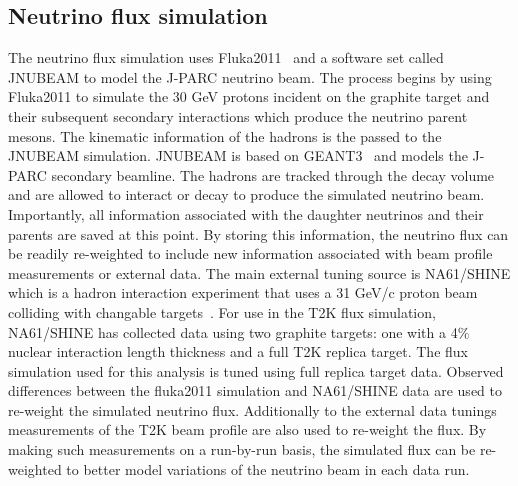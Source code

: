 \subsection{Neutrino flux simulation}
\label{subsec:NeutrinoFluxSimulation}
The neutrino flux simulation uses Fluka2011~\cite{Ferrari_fluka:a} and a software set called JNUBEAM to model the J-PARC neutrino beam.  The process begins by using Fluka2011 to simulate the 30 GeV protons incident on the graphite target and their subsequent secondary interactions which produce the neutrino parent mesons.  The kinematic information of the hadrons is the passed to the JNUBEAM simulation.  JNUBEAM is based on GEANT3~\cite{Brun:1987ma} and models the J-PARC secondary beamline.  The hadrons are tracked through the decay volume and are allowed to interact or decay to produce the simulated neutrino beam.  Importantly, all information associated with the daughter neutrinos and their parents are saved at this point.  By storing this information, the neutrino flux can be readily re-weighted to include new information associated with beam profile measurements or external data.
\newline
The main external tuning source is NA61/SHINE which is a hadron interaction experiment that uses a 31 GeV/c proton beam colliding with changable targets~\cite{PhysRevC.84.034604}.  For use in the T2K flux simulation, NA61/SHINE has collected data using two graphite targets: one with a 4$\%$ nuclear interaction length thickness and a full T2K replica target.  The flux simulation used for this analysis is tuned using full replica target data.  Observed differences between the fluka2011 simulation and NA61/SHINE data are used to re-weight the simulated neutrino flux.
\newline
Additionally to the external data tunings measurements of the T2K beam profile are also used to re-weight the flux.  By making such measurements on a run-by-run basis, the simulated flux can be re-weighted to better model variations of the neutrino beam in each data run.
